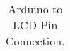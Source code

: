 \documentclass[12pt%
                    ]{report}
\begin{document}
\begin{table}[!h]
	\caption{Arduino to LCD Pin Connection.}             %
\begin{tabular}[c]{%
	b{\gnumericColA}%
	b{\gnumericColB}%
	b{\gnumericColC}%
	b{\gnumericColD}%
	}







\end{tabular}
\end{table}
\end{document}
